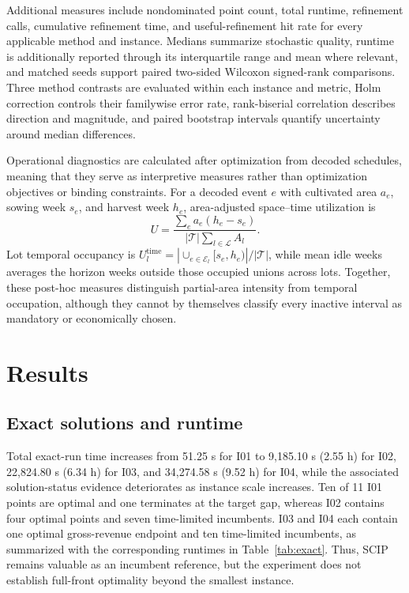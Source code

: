 \documentclass[]{interact}
\newcommand{\Lset}{\mathcal{L}}
\newcommand{\Tset}{\mathcal{T}}
\begin{document}
Additional measures include nondominated point count, total runtime, refinement calls, cumulative refinement time, and useful-refinement hit rate for every applicable method and instance. Medians summarize stochastic quality, runtime is additionally reported through its interquartile range and mean where relevant, and matched seeds support paired two-sided Wilcoxon signed-rank comparisons. Three method contrasts are evaluated within each instance and metric, Holm correction controls their familywise error rate, rank-biserial correlation describes direction and magnitude, and paired bootstrap intervals quantify uncertainty around median differences.

Operational diagnostics are calculated after optimization from decoded schedules, meaning that they serve as interpretive measures rather than optimization objectives or binding constraints. For a decoded event $e$ with cultivated area $a_e$, sowing week $s_e$, and harvest week $h_e$, area-adjusted space--time utilization is
\begin{equation}
U=\frac{\sum_e a_e(h_e-s_e)}{|\Tset|\sum_{l\in\Lset}A_l}. \label{eq:utilization}
\end{equation}
Lot temporal occupancy is $U_l^{\mathrm{time}}=|\cup_{e\in\mathcal E_l}[s_e,h_e)|/|\Tset|$, while mean idle weeks averages the horizon weeks outside those occupied unions across lots. Together, these post-hoc measures distinguish partial-area intensity from temporal occupation, although they cannot by themselves classify every inactive interval as mandatory or economically chosen.

\section{Results}

\subsection{Exact solutions and runtime}

Total exact-run time increases from 51.25 s for I01 to 9,185.10 s (2.55 h) for I02, 22,824.80 s (6.34 h) for I03, and 34,274.58 s (9.52 h) for I04, while the associated solution-status evidence deteriorates as instance scale increases. Ten of 11 I01 points are optimal and one terminates at the target gap, whereas I02 contains four optimal points and seven time-limited incumbents. I03 and I04 each contain one optimal gross-revenue endpoint and ten time-limited incumbents, as summarized with the corresponding runtimes in Table~\ref{tab:exact}. Thus, SCIP remains valuable as an incumbent reference, but the experiment does not establish full-front optimality beyond the smallest instance.
\end{document}
